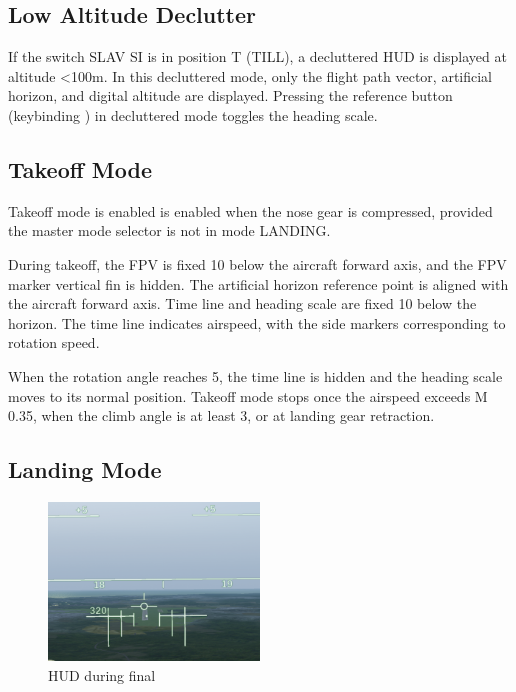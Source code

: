 \subsection{Low Altitude Declutter}
\label{sec:hud-declutter}
If the switch SLAV SI is in position T (TILL), a decluttered HUD is displayed at altitude <100m.
In this decluttered mode, only the flight path vector,
artificial horizon, and digital altitude are displayed.
Pressing the reference button (keybinding )
in decluttered mode toggles the heading scale.

\subsection{Takeoff Mode}
Takeoff mode is enabled is enabled when the nose gear is compressed,
provided the master mode selector is not in mode LANDING.

During takeoff, the FPV is fixed 10\textdegree{} below the aircraft forward axis,
and the FPV marker vertical fin is hidden.
The artificial horizon reference point is aligned with the aircraft forward axis.
Time line and heading scale are fixed 10\textdegree{} below the horizon.
The time line indicates airspeed, with the side markers corresponding to rotation speed.

When the rotation angle reaches 5\textdegree{},
the time line is hidden and the heading scale moves to its normal position.
Takeoff mode stops once the airspeed exceeds M 0.35,
when the climb angle is at least 3\textdegree{},
or at landing gear retraction.

\subsection{Landing Mode}
\begin{figure}[!ht]
  \centering
  \includegraphics[width=0.5\textwidth]{images/displays/ajs-hud-landing.png}
  \caption{HUD during final}
  \label{fig:hud-landing}
\end{figure}

